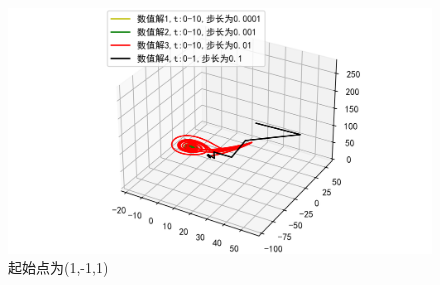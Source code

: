 \documentclass[a4paper]{article}%
\begin{document}
\begin{figure}[H]
    \centering
    \includegraphics[scale=0.8]{35}
    \caption{起始点为(1,-1,1)}
\end{figure}
\end{document}
